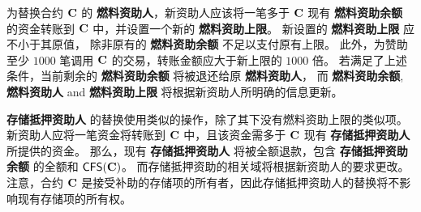 为替换合约 $\mathbf{C}$ 的 \textbf{燃料资助人}，新资助人应该将一笔多于 $\mathbf{C}$ 现有 \textbf{燃料资助余额} 的资金转账到 $\mathbf{C}$ 中，并设置一个新的 \textbf{燃料资助上限}。
新设置的 \textbf{燃料资助上限} 应不小于其原值，
除非原有的 \textbf{燃料资助余额} 不足以支付原有上限。
此外，为赞助至少 $1000$ 笔调用 $\mathbf{C}$ 的交易，转账金额应大于新上限的 $1000$ 倍。
若满足了上述条件，当前剩余的 \textbf{燃料资助余额} 将被退还给原 \textbf{燃料资助人}，
而 \textbf{燃料资助余额}, \textbf{燃料资助人} and \textbf{燃料资助上限} 将根据新资助人所明确的信息更新。


\textbf{存储抵押资助人} 的替换使用类似的操作，除了其下没有燃料资助上限的类似项。
新资助人应将一笔资金将转账到 $\mathbf{C}$ 中，且该资金需多于 $\mathbf{C}$ 现有 \textbf{存储抵押资助人} 所提供的资金。
那么，现有 \textbf{存储抵押资助人} 将被全额退款，包含 \textbf{存储抵押资助余额} 的全额和 $\mathsf{CFS}(\mathbf{C})$。
而存储抵押资助的相关域将根据新资助人的要求更改。
注意，合约 $\mathbf{C}$ 是接受补助的存储项的所有者，因此存储抵押资助人的替换将不影响现有存储项的所有权。

